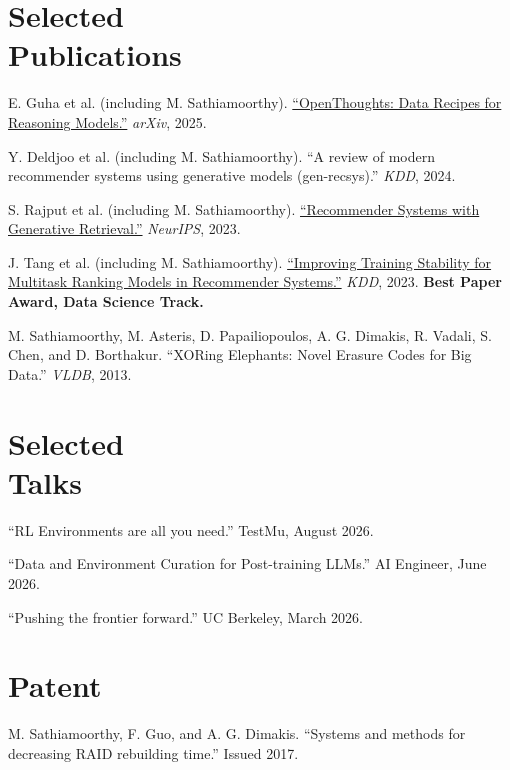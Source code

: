 \begin{resume}
\section{\mysidestyle Selected\\Publications}
\begin{list2}
  \item E. Guha et al. (including M. Sathiamoorthy).
    \href{https://arxiv.org/abs/2506.04178}{``OpenThoughts: Data Recipes for Reasoning Models.''}
    \textsl{arXiv}, 2025.
  \item Y. Deldjoo et al. (including M. Sathiamoorthy).
    ``A review of modern recommender systems using generative models (gen-recsys).''
    \textsl{KDD}, 2024.
  \item S. Rajput et al. (including M. Sathiamoorthy).
    \href{https://arxiv.org/abs/2305.05065}{``Recommender Systems with Generative Retrieval.''}
    \textsl{NeurIPS}, 2023.
  \item J. Tang et al. (including M. Sathiamoorthy).
    \href{https://arxiv.org/abs/2302.09178}{``Improving Training Stability for Multitask Ranking Models in Recommender Systems.''}
    \textsl{KDD}, 2023. \textbf{Best Paper Award, Data Science Track.}
  \item M. Sathiamoorthy, M. Asteris, D. Papailiopoulos, A. G. Dimakis,
    R. Vadali, S. Chen, and D. Borthakur.
    ``XORing Elephants: Novel Erasure Codes for Big Data.'' \textsl{VLDB}, 2013.
\end{list2}

\section{\mysidestyle Selected\\Talks}
\begin{list2}
  \item ``RL Environments are all you need.'' TestMu, August 2026.
  \item ``Data and Environment Curation for Post-training LLMs.'' AI Engineer, June 2026.
  \item ``Pushing the frontier forward.'' UC Berkeley, March 2026.
\end{list2}

\section{\mysidestyle Patent}
\begin{list2}
  \item M. Sathiamoorthy, F. Guo, and A. G. Dimakis.
    ``Systems and methods for decreasing RAID rebuilding time.'' Issued 2017.
\end{list2}

\end{resume}

